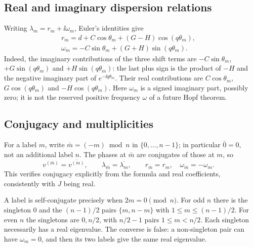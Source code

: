 \subsection{Real and imaginary dispersion relations}

Writing $\lambda_m=r_m+\ii\omega_m$, Euler's identities give
\begin{align}
 \boxed{r_m=d+C\cos\theta_m+(G-H)\cos(q\theta_m),}
   \label{eq:P04-real}\\
 \boxed{\omega_m=-C\sin\theta_m+(G+H)\sin(q\theta_m).}
   \label{eq:P04-imag}
\end{align}
Indeed, the imaginary contributions of the three shift terms are
$-C\sin\theta_m$, $+G\sin(q\theta_m)$ and
$+H\sin(q\theta_m)$: the last plus sign is the product of
$-H$ and the negative imaginary part of $e^{-\ii q\theta_m}$.
Their real contributions are $C\cos\theta_m$,
$G\cos(q\theta_m)$ and $-H\cos(q\theta_m)$.
Here $\omega_m$ is a signed imaginary part, possibly zero; it is not
the reserved positive frequency $\omega$ of a future Hopf theorem.

\subsection{Conjugacy and multiplicities}

For a label $m$, write $\bar m=(-m)\bmod n$ in $\{0,\ldots,n-1\}$;
in particular $\bar0=0$, not an additional label $n$.
The phases at $\bar m$ are conjugates of those at $m$, so
\begin{equation}
 v^{(\bar m)}=\overline{v^{(m)}},\qquad
 \lambda_{\bar m}=\overline{\lambda_m},\qquad
 r_{\bar m}=r_m,\quad \omega_{\bar m}=-\omega_m.
 \label{eq:P04-conjugacy}
\end{equation}
This verifies conjugacy explicitly from the formula and real
coefficients, consistently with $J$ being real.

A label is self-conjugate precisely when $2m=0\pmod n$.
For odd $n$ there is the singleton $0$ and the $(n-1)/2$ pairs
$\{m,n-m\}$ with $1\le m\le(n-1)/2$.
For even $n$ the singletons are $0,n/2$, with $n/2-1$ pairs
$1\le m<n/2$. Each singleton necessarily has a real eigenvalue.
The converse is false: a non-singleton pair can have $\omega_m=0$,
and then its two labels give the same real eigenvalue.

